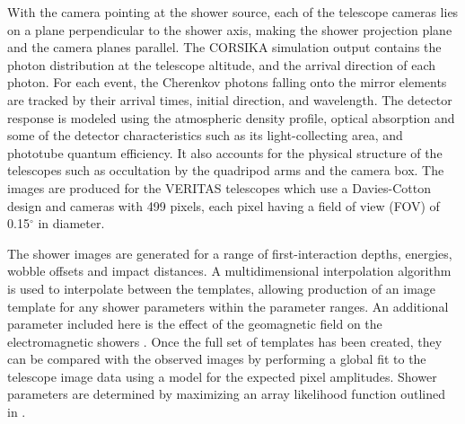 \documentclass[main.tex]{subfiles}
\begin{document}
With the camera pointing at the shower source, each of the telescope cameras lies on a plane perpendicular to the shower axis, making the shower projection plane and the camera planes parallel. The CORSIKA simulation output contains the photon distribution at the telescope altitude, and the arrival direction of each photon. For each event, the Cherenkov photons falling onto the mirror elements are tracked by their arrival times, initial direction, and wavelength. The detector response is modeled using the atmospheric density profile, optical absorption and some of the detector characteristics such as its light-collecting area, and phototube quantum efficiency. It also accounts for the physical structure of the telescopes such as occultation by the quadripod arms and the camera box. The images are produced for the VERITAS telescopes which use a Davies-Cotton design and cameras with 499 pixels, each pixel having a field of view (FOV) of 0.15$^\circ$ in diameter.

The shower images are generated for a range of first-interaction depths, energies, wobble offsets and impact distances. A multidimensional interpolation algorithm is used to interpolate between the templates, allowing production of an image template for any shower parameters within the parameter ranges. An additional parameter included here is the effect of the geomagnetic field on the electromagnetic showers \cite{Vincent:2015bnj}.
Once the full set of templates has been created, they can be compared with the observed images by performing a global fit to the telescope image data using a model for the expected pixel amplitudes. Shower parameters are determined by maximizing an array likelihood function outlined in \cite{deNaurois}.
\end{document}
